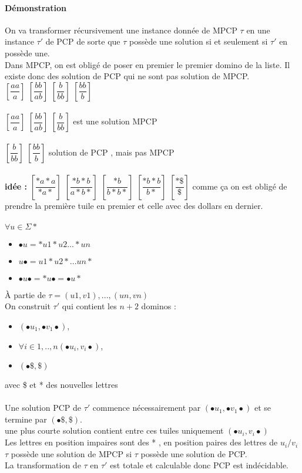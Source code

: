 \documentclass{article}
\begin{document}
{{\paragraph{Démonstration} On va transformer récursivement une instance donnée de MPCP $\tau$ en une instance $\tau'$ de PCP de sorte que $\tau$ possède une solution si et seulement si $\tau'$ en possède une.\\
Dans MPCP, on est obligé de poser en premier le premier domino de la liste. Il existe donc des solution de PCP qui ne sont pas solution de MPCP.\\ $[\dfrac{aa}{a}]$ $[\dfrac{bb}{ab}]$ 
$[\dfrac{b}{bb}]$ $[\dfrac{bb}{b}]$ \\\\
$[\dfrac{aa}{a}]$ $[\dfrac{bb}{ab}]$ $[\dfrac{b}{bb}]$ est une solution MPCP\\\\
 $[\dfrac{b}{bb}]$ $[\dfrac{bb}{b}]$ solution de PCP , mais pas MPCP\\\\
 \textbf{idée : } $[\dfrac{*a*a}{*a*}]$ $[\dfrac{*b*b}{a*b*}]$ 
$[\dfrac{*b}{b*b*}]$ $[\dfrac{*b*b}{b*}]$ $[\dfrac{*\$}{\$}]$ 
comme ça on est obligé de prendre la première tuile en premier et celle avec des dollars en dernier.\\\\
$\forall u \in \Sigma*$
\begin{itemize}
\item $\bullet u = *u1*u2...*un$
\item $u\bullet=u1*u2*...un*$
\item $\bullet u \bullet = *u\bullet = \bullet u*$
\end{itemize}
À partie de $\tau = {(u1,v1),...,(un,vn)}$\\On construit $\tau'$ qui contient les $n+2$ dominos : 
\begin{itemize}
\item $(\bullet u_{1},\bullet v_{1}\bullet)$,
\item $\forall i \in {1,..,n} (\bullet u_{i},v_{i}\bullet)$,
\item $(\bullet\$,\$)$ 
\end{itemize}
avec \$ et * des nouvelles lettres
\paragraph{} Une solution PCP de $\tau'$ commence nécessairement par $(\bullet u_{1},\bullet v_{1}\bullet)$ et se termine par  $(\bullet\$,\$)$.\\ une plus courte solution contient entre ces tuiles uniquement $(\bullet u_{i},v_{i}\bullet)$\\Les lettres en position impaires sont des * , en position paires des lettres de $u_{i}/v_{i}$\\$\tau$ possède une solution de MPCP si $\tau$  possède une solution de PCP.\\La transformation de $\tau$ en $\tau'$ est totale et calculable donc PCP est indécidable.
}}
\end{document}

